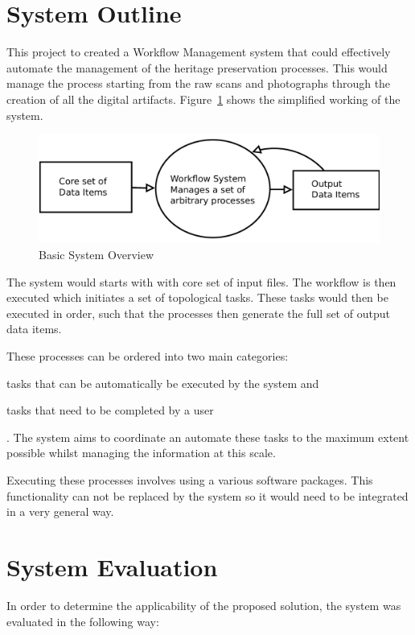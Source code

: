 \documentclass[12pt,a4paper]{report}
\begin{document}
\section{System Outline}
    This project to created a Workflow Management system that could effectively
    automate the management of the heritage preservation processes.
	This would manage the process starting from the raw scans and photographs
	through the creation of all the digital artifacts. Figure~\ref{intro:basic}
	shows the simplified working of the system.
	\begin{figure}[!h]
		\begin{center}
			\includegraphics[scale=0.34]{figures/basic_system.pdf}
		\end{center}
		\caption{Basic System Overview}
		\label{intro:basic}
	\end{figure}

	\noindent The system would starts with with
	core set of input files. The workflow is then executed which initiates a set
	of topological tasks. These tasks would then be executed in order, such that
    the processes then generate the full set of output data items.

    These processes can be ordered into two main categories:
    \begin{inparaenum}[i)]
        \item tasks that can be automatically be executed by the system and
        \item tasks that need to be completed by a user
    \end{inparaenum}. The system aims to coordinate an automate these tasks to
    the maximum extent possible whilst managing the information at this
    scale.

    Executing these processes involves using a various software packages.
    This functionality can not be replaced by the system so it would need
    to be integrated in a very general way.

\section{System Evaluation}
    In order to determine the applicability of the proposed solution, the system
    was evaluated in the following way:
\end{document}
